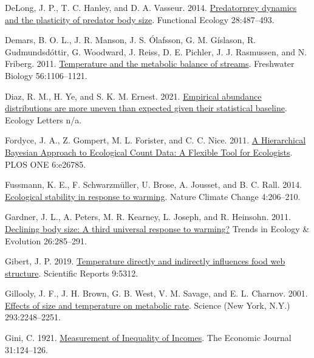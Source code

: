 \documentclass[
]{article}
\newlength{\cslhangindent}
\newlength{\cslentryspacingunit} %
\newenvironment{CSLReferences}[2] %
 {%
  \setlength{\parindent}{0pt}
  \ifodd #1
  \let\oldpar\par
  \def\par{\hangindent=\cslhangindent\oldpar}
  \fi
  \setlength{\parskip}{#2\cslentryspacingunit}
 }%
 {}
\begin{document}
\begin{CSLReferences}{1}{0}
\leavevmode{}%
DeLong, J. P., T. C. Hanley, and D. A. Vasseur. 2014.
\href{https://doi.org/10.1111/1365-2435.12199}{Predator\textendash prey
dynamics and the plasticity of predator body size}. Functional Ecology
28:487--493.

\leavevmode{}%
Demars, B. O. L., J. R. Manson, J. S. Ólafsson, G. M. Gíslason, R.
Gudmundsdóttir, G. Woodward, J. Reiss, D. E. Pichler, J. J. Rasmussen,
and N. Friberg. 2011.
\href{https://doi.org/10.1111/j.1365-2427.2010.02554.x}{Temperature and
the metabolic balance of streams}. Freshwater Biology 56:1106--1121.

\leavevmode{}%
Diaz, R. M., H. Ye, and S. K. M. Ernest. 2021.
\href{https://doi.org/10.1111/ele.13820}{Empirical abundance
distributions are more uneven than expected given their statistical
baseline}. Ecology Letters n/a.

\leavevmode{}%
Fordyce, J. A., Z. Gompert, M. L. Forister, and C. C. Nice. 2011.
\href{https://doi.org/10.1371/journal.pone.0026785}{A {Hierarchical
Bayesian Approach} to {Ecological Count Data}: {A Flexible Tool} for
{Ecologists}}. PLOS ONE 6:e26785.

\leavevmode{}%
Fussmann, K. E., F. Schwarzmüller, U. Brose, A. Jousset, and B. C. Rall.
2014. \href{https://doi.org/10.1038/nclimate2134}{Ecological stability
in response to warming}. Nature Climate Change 4:206--210.

\leavevmode{}%
Gardner, J. L., A. Peters, M. R. Kearney, L. Joseph, and R. Heinsohn.
2011. \href{https://doi.org/10.1016/j.tree.2011.03.005}{Declining body
size: A third universal response to warming?} Trends in Ecology \&
Evolution 26:285--291.

\leavevmode{}%
Gibert, J. P. 2019.
\href{https://doi.org/10.1038/s41598-019-41783-0}{Temperature directly
and indirectly influences food web structure}. Scientific Reports
9:5312.

\leavevmode{}%
Gillooly, J. F., J. H. Brown, G. B. West, V. M. Savage, and E. L.
Charnov. 2001. \href{https://doi.org/10.1126/science.1061967}{Effects of
size and temperature on metabolic rate}. Science (New York, N.Y.)
293:2248--2251.

\leavevmode{}%
Gini, C. 1921. \href{https://doi.org/10.2307/2223319}{Measurement of
{Inequality} of {Incomes}}. The Economic Journal 31:124--126.


\end{CSLReferences}
\end{document}
